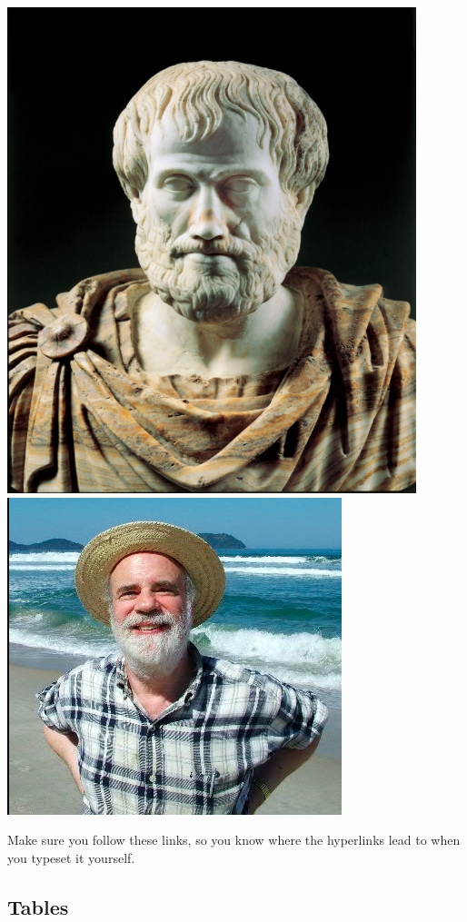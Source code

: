 \documentclass[10pt, Computer Modern]{article}
\begin{document}
	\includegraphics[scale=0.4]{aristotle.png}
	\includegraphics[scale=0.6]{kripke.png}



	Make sure you follow these links, so you know where the hyperlinks lead to when you typeset it yourself.

	\subsection{Tables}
	\clearpage

	
	


\end{document}
